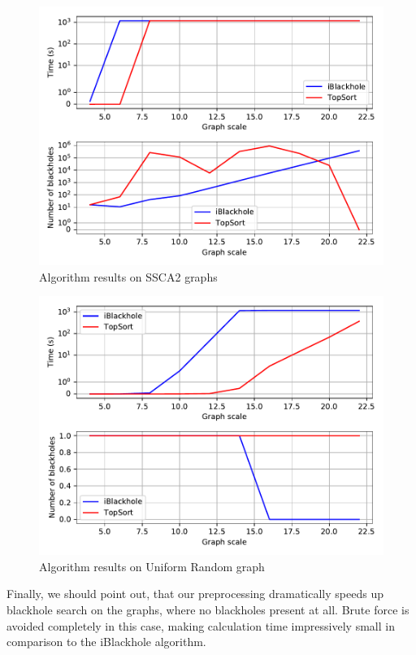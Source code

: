 \documentclass{svproc}
\begin{document}
\begin{figure}[H]
	\includegraphics[width=\linewidth]{ssca2.pdf}
	\caption{Algorithm results on SSCA2 graphs}
	\label{fig:ssca2}
\end{figure}
\begin{figure}[H]
	\includegraphics[width=\linewidth]{ur.pdf}
	\caption{Algorithm results on Uniform Random graph}
	\label{fig:ur}
\end{figure}

Finally, we should point out, that our preprocessing dramatically speeds up blackhole search on the graphs, where no blackholes present at all. Brute force is
avoided completely in this case, making calculation time impressively small in comparison to the iBlackhole algorithm.
\end{document}
